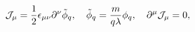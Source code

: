 \begin{equation}
\label{ct}
{\cal J}_{\mu}=\frac 12 \epsilon_{\mu\nu}\partial^{\nu}{\tilde\phi}_q, \quad
 {\tilde\phi}_q=\frac{m}{q\lambda}\phi_q, \quad
\partial^{\mu}{\cal J}_{\mu}=0,
\end{equation}

